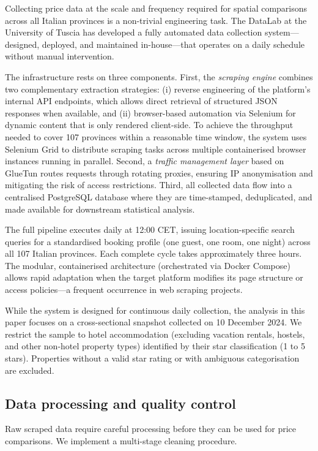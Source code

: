\documentclass[12pt,a4paper]{article}
\begin{document}
Collecting price data at the scale and frequency required for spatial comparisons across all Italian provinces is a non-trivial engineering task. The DataLab at the University of Tuscia has developed a fully automated data collection system---designed, deployed, and maintained in-house---that operates on a daily schedule without manual intervention.

The infrastructure rests on three components. First, the \textit{scraping engine} combines two complementary extraction strategies: (i) reverse engineering of the platform's internal API endpoints, which allows direct retrieval of structured JSON responses when available, and (ii) browser-based automation via Selenium for dynamic content that is only rendered client-side. To achieve the throughput needed to cover 107 provinces within a reasonable time window, the system uses Selenium Grid to distribute scraping tasks across multiple containerised browser instances running in parallel. Second, a \textit{traffic management layer} based on GlueTun routes requests through rotating proxies, ensuring IP anonymisation and mitigating the risk of access restrictions. Third, all collected data flow into a centralised PostgreSQL database where they are time-stamped, deduplicated, and made available for downstream statistical analysis.

The full pipeline executes daily at 12:00 CET, issuing location-specific search queries for a standardised booking profile (one guest, one room, one night) across all 107 Italian provinces. Each complete cycle takes approximately three hours. The modular, containerised architecture (orchestrated via Docker Compose) allows rapid adaptation when the target platform modifies its page structure or access policies---a frequent occurrence in web scraping projects.

While the system is designed for continuous daily collection, the analysis in this paper focuses on a cross-sectional snapshot collected on 10 December 2024. We restrict the sample to hotel accommodation (excluding vacation rentals, hostels, and other non-hotel property types) identified by their star classification (1 to 5 stars). Properties without a valid star rating or with ambiguous categorisation are excluded.

\subsection{Data processing and quality control}

Raw scraped data require careful processing before they can be used for price comparisons. We implement a multi-stage cleaning procedure.
\end{document}
